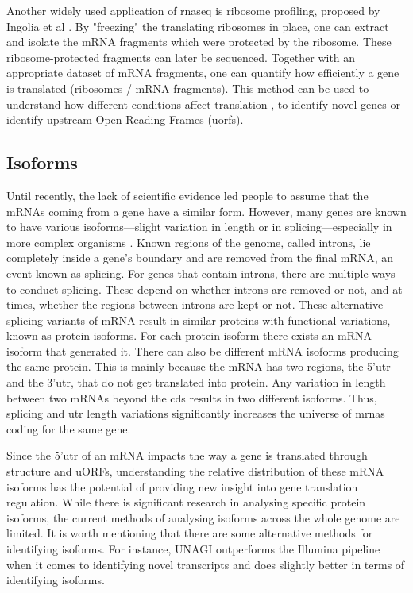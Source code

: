 \documentclass[12pt]{article}
\begin{document}
    Another widely used application of \acrshort{rnaseq} is ribosome profiling, proposed by Ingolia et al \cite{Ingolia2012}. By "freezing" the translating ribosomes in place, one can extract and isolate the mRNA fragments which were protected by the ribosome. These ribosome-protected fragments can later be sequenced. Together with an appropriate dataset of mRNA fragments, one can quantify how efficiently a gene is translated (ribosomes / mRNA fragments). This method can be used to understand how different conditions affect translation \cite{Zhong2016, Chothani2019}, to identify novel genes or identify upstream Open Reading Frames (u\acrshort{orf}s).
    
    
\subsection{Isoforms}
Until recently, the lack of scientific evidence led people to assume that the mRNAs coming from a gene have a similar form. However, many genes are known to have various isoforms---slight variation in length or in splicing---especially in more complex organisms \cite{Rees2003, Hunt1992}. Known regions of the genome, called introns, lie completely inside a gene's boundary and are removed from the final mRNA, an event known as splicing. For genes that contain introns, there are multiple ways to conduct splicing. These depend on whether introns are removed or not, and at times, whether the regions between introns are kept or not. These alternative splicing variants of mRNA result in similar proteins with functional variations, known as protein isoforms. 
For each protein isoform there exists an mRNA isoform that generated it. There can also be different mRNA isoforms producing the same protein. This is mainly because the mRNA has two regions, the 5'\acrshort{utr} and the 3'\acrshort{utr}, that do not get translated into protein. Any variation in length between two mRNAs beyond the \gls{cds} results in two different isoforms. Thus, splicing and \acrshort{utr} length variations significantly increases the universe of \acrshort{mrna}s coding for the same gene.

Since the 5'\acrshort{utr} of an mRNA impacts the way a gene is translated through structure and uORFs, understanding the relative distribution of these mRNA isoforms has the potential of providing new insight into gene translation regulation.  While there is significant research in analysing specific protein isoforms, the current methods of analysing isoforms across the whole genome are limited.  It is worth mentioning that there are some alternative methods for identifying isoforms. For instance, UNAGI \cite{Alkadi2020} outperforms the Illumina pipeline when it comes to identifying novel transcripts and does slightly better in terms of identifying isoforms. 
\end{document}
